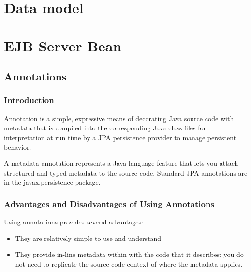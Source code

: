 
\section{Data model}

\section{EJB Server Bean}

\subsection{Annotations}
\subsubsection{Introduction}
Annotation is a simple, expressive means of decorating Java source code with metadata that is compiled into the corresponding Java class files for interpretation at run time by a JPA persistence provider to manage persistent behavior.

A metadata annotation represents a Java language feature that lets you attach structured and typed metadata to the source code. Standard JPA annotations are in the javax.persistence package.

\subsubsection{Advantages and Disadvantages of Using Annotations}
Using annotations provides several advantages:
\begin{itemize}
\item They are relatively simple to use and understand.
\item They provide in-line metadata within with the code that it describes; you do not need to replicate the source code context of where the metadata applies.
\end{itemize}

